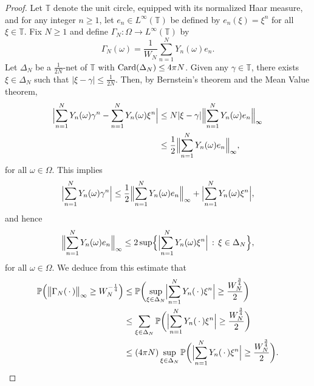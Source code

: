 \documentclass[12pt]{amsart}
\newcommand{\Pdb}{\mbox{$\mathbb{P}$}}
\newcommand{\Tdb}{\mbox{$\mathbb{T}$}}
\newcommand{\bignorm}[1]{\bigl\Vert#1\bigr\Vert}
\newcommand{\Bignorm}[1]{\Bigl\Vert#1\Bigr\Vert}
\theoremstyle{remark}
\theoremstyle{definition}
\numberwithin{equation}{section}
\begin{document}
\begin{proof}
Let $\Tdb$ denote the unit circle, equipped with its normalized Haar measure, and for any integer $n\geq 1$, let $e_n\in L^\infty(\Tdb)$ be defined by $e_n(\xi)=\xi^n$ for all $\xi\in\Tdb$. Fix $N\geq 1$ and define $\Gamma_N\colon \Omega\to L^\infty(\Tdb)$ by 
$$
\Gamma_N(\omega) = \frac{1}{W_N}\sum_{n=1}^N Y_n(\omega)e_n.
$$
Let $\Delta_N$ be a $\frac{1}{2N}$-net of $\Tdb$ with
${\rm Card}(\Delta_N)\leq 4\pi N$. 
Given any $\gamma\in\Tdb$, there exists $\xi\in\Delta_N$ such that 
$\vert \xi-\gamma\vert\leq\frac{1}{2N}$. Then, by Bernstein's 
theorem and the Mean Value theorem,
\begin{align*}
\Bigl\vert\sum_{n=1}^N Y_n(\omega) \gamma^n
- \sum_{n=1}^N Y_n(\omega) \xi^n\Bigr\vert
&\leq N\vert \xi-\gamma\vert
\Bignorm{\sum_{n=1}^N Y_n(\omega) e_n}_\infty\\
&\leq \frac12 
\Bignorm{\sum_{n=1}^N Y_n(\omega) e_n}_\infty,
\end{align*}
for all $\omega\in\Omega$.
This implies
$$
\Bigl\vert\sum_{n=1}^N Y_n(\omega) \gamma^n\Bigr\vert\leq
\frac12 
\Bignorm{\sum_{n=1}^N Y_n(\omega) e_n}_\infty
+ \Bigl\vert\sum_{n=1}^N Y_n(\omega) \xi^n\Bigr\vert,
$$
and hence
$$
\Bignorm{\sum_{n=1}^N Y_n(\omega) e_n}_\infty\leq 
2 \sup\Bigl\{\Bigl\vert\sum_{n=1}^N Y_n(\omega) \xi^n\Bigr\vert\,:\, \xi\in\Delta_N\Bigr\},
$$
for all $\omega\in\Omega$. We deduce from this estimate that 
\begin{align*}
\Pdb\Bigl(\bignorm{\Gamma_N(\,\cdotp)}_\infty\geq W_N^{-\frac14} \Bigr)
& \leq
\Pdb\biggl(\sup_{\xi\in\Delta_N}
\Bigl\vert\sum_{n=1}^N Y_n(\,\cdotp) \xi^n\Bigr\vert
\geq \frac{W_N^\frac34}{2}\biggr)\\
& \leq \sum_{\xi\in\Delta_N} \Pdb\biggl(
\Bigl\vert\sum_{n=1}^N Y_n(\,\cdotp) \xi^n\Bigr\vert\geq 
\frac{W_N^\frac34}{2}\biggr)\\
&\leq (4\pi N) \sup_{\xi\in\Delta_N}\Pdb\biggl(\Bigl\vert\sum_{n=1}^N Y_n(\,\cdotp) \xi^n\Bigr\vert\geq 
\frac{W_N^\frac34}{2}\biggr).
\end{align*}


\end{proof}
\end{document}
